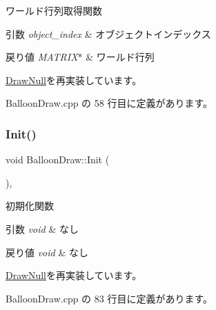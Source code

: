 ワールド行列取得関数 


\begin{DoxyParams}{引数}
{\em object\+\_\+index} & オブジェクトインデックス \\
\hline
\end{DoxyParams}

\begin{DoxyRetVals}{戻り値}
{\em M\+A\+T\+R\+I\+X$\ast$} & ワールド行列 \\
\hline
\end{DoxyRetVals}


\mbox{\hyperlink{class_draw_null_a9aac059eb3b5d1f77e8bd3aa0647cff9}{Draw\+Null}}を再実装しています。



 Balloon\+Draw.\+cpp の 58 行目に定義があります。

\mbox{\label{class_balloon_draw_ad00ffd9c5316e08938259e1f1116812f}} 
\subsubsection{\texorpdfstring{Init()}{Init()}}
{\footnotesize\ttfamily void Balloon\+Draw\+::\+Init (\begin{DoxyParamCaption}{ }\end{DoxyParamCaption})\hspace{0.3cm}{\ttfamily [override]}, {\ttfamily [virtual]}}



初期化関数 


\begin{DoxyParams}{引数}
{\em void} & なし \\
\hline
\end{DoxyParams}

\begin{DoxyRetVals}{戻り値}
{\em void} & なし \\
\hline
\end{DoxyRetVals}


\mbox{\hyperlink{class_draw_null_a20aef1e54c1a158b741bfd731e18efdf}{Draw\+Null}}を再実装しています。



 Balloon\+Draw.\+cpp の 83 行目に定義があります。

\mbox{\label{class_balloon_draw_a9c38865af6eb74b163fcdd6204c42e3e}} 
